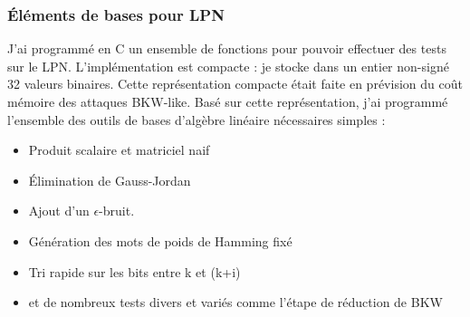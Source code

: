 \documentclass{article}		%
\theoremstyle{definition}
\theoremstyle{plain}
\theoremstyle{plain}
\theoremstyle{plain}
\theoremstyle{plain}
\theoremstyle{plain}
\begin{document}
\subsubsection{Éléments de bases pour LPN}
J'ai programmé en C un ensemble de fonctions pour pouvoir effectuer des
tests sur le LPN. L'implémentation est compacte : je stocke dans un
entier non-signé 32 valeurs binaires. Cette représentation compacte était
faite en prévision du coût mémoire des attaques BKW-like. Basé sur cette représentation, j'ai
programmé l'ensemble des outils de bases d'algèbre linéaire nécessaires
simples :
\\
\begin{itemize}
\item Produit scalaire et matriciel naif 
\item Élimination de Gauss-Jordan
\item Ajout d'un $\epsilon$-bruit.
\item Génération des mots de poids de Hamming fixé
\item Tri rapide sur les bits entre k et (k+i)
\item et de nombreux tests divers et variés comme l'étape de réduction de
BKW
\end{itemize}
\end{document}
